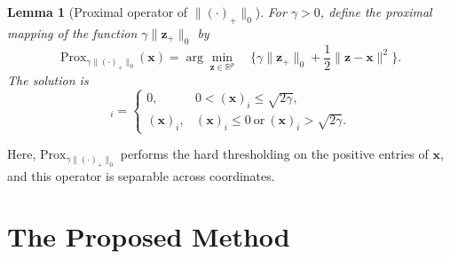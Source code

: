 \documentclass[sn-mathphys]{JORSC-jnl}%
\theoremstyle{thmstyleone}%
\theoremstyle{thmstylethree}%
\newtheorem{lemma}{Lemma}
\theoremstyle{thmstyleone} %
\begin{document}
\begin{lemma}[Proximal operator of $\|(\cdot)_+\|_0$]
For $\gamma>0$, define the proximal mapping of the function $\gamma\|\mathbf{z}_+\|_0$ by
\begin{equation*}
\mathrm{Prox}_{\gamma \|(\cdot)_+\|_0}(\mathbf{x})
=
\arg\min_{\mathbf{z}\in\mathbb{R}^p}\quad
\{
\gamma\|\mathbf{z}_+\|_0+\frac{1}{2}\|\mathbf{z}-\mathbf{x}\|^2
\}.
\end{equation*}
The solution is
\begin{equation*}
[\mathrm{Prox}_{\gamma\|(\cdot)_+\|_0}(\mathbf{x})]_i
=
\begin{cases}
0,& 0<(\mathbf{x})_i\le \sqrt{2\gamma},\\
(\mathbf{x})_i,& (\mathbf{x})_i\le 0 ~\text{or}~(\mathbf{x})_i>\sqrt{2\gamma}.
\end{cases}
\end{equation*}
\end{lemma}
Here, $\mathrm{Prox}_{\gamma\|(\cdot)_+\|_0}$ performs the hard thresholding on the positive entries of $\mathbf{x}$, and this operator is separable across coordinates. 

\section{The Proposed Method}\label{sec3}
\end{document}
